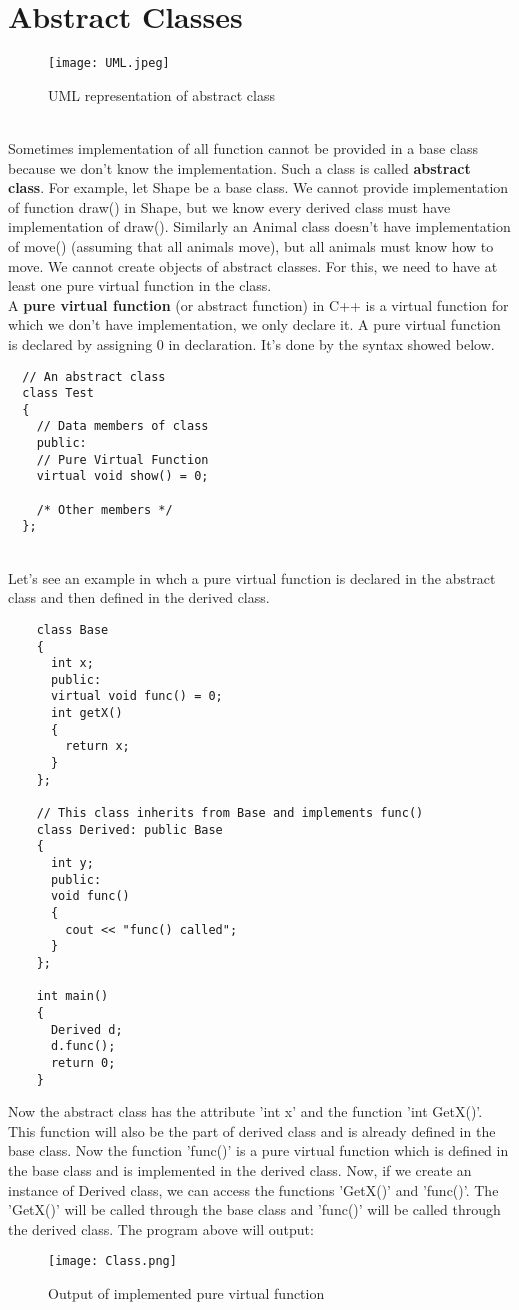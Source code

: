 \documentclass[11pt,fleqn]{book} %
\begin{document}
\section{Abstract Classes}
\begin{figure}[h]
  \centering
  \texttt{[image: UML.jpeg]}
  \caption{UML representation of abstract class}
\end{figure} ~\\
Sometimes implementation of all function cannot be provided in a base class because we don’t know the implementation. Such a class is called \textbf{abstract class}. For example, let Shape be a base class. We cannot provide implementation of function draw() in Shape, but we know every derived class must have implementation of draw(). Similarly an Animal class doesn’t have implementation of move() (assuming that all animals move), but all animals must know how to move. We cannot create objects of abstract classes. For this, we need to have at least one pure virtual function in the class. \\
A \textbf{pure virtual function} (or abstract function) in C++ is a virtual function for which we don’t have implementation, we only declare it. A pure virtual function is declared by assigning 0 in declaration. It's done by the syntax showed below.
\begin{lstlisting}
  // An abstract class
  class Test
  {   
    // Data members of class
    public:
    // Pure Virtual Function
    virtual void show() = 0;

    /* Other members */
  };
\end{lstlisting} ~\\
Let's see an example in whch a pure virtual function is declared in the abstract class and then defined in the derived class.
\begin{example}
  \begin{lstlisting}
    class Base
    {
      int x;
      public:
      virtual void func() = 0;
      int getX() 
      {
        return x; 
      }
    };

    // This class inherits from Base and implements func()
    class Derived: public Base
    {
      int y;
      public:
      void func()
      {
        cout << "func() called";
      }
    };

    int main()
    {
      Derived d;
      d.func();
      return 0;
    }
  \end{lstlisting}
  Now the abstract class has the attribute 'int x' and the function 'int GetX()'. This function will also be the part of derived class and is already defined in the base class. Now the function 'func()' is a pure virtual function which is defined in the base class and is implemented in the derived class. Now, if we create an instance of Derived class, we can access the functions 'GetX()' and 'func()'. The 'GetX()' will be called through the base class and 'func()' will be called through the derived class.
  The program above will output:
  \begin{figure}[h]
    \centering
    \texttt{[image: Class.png]}
    \caption{Output of implemented pure virtual function}
  \end{figure}
\end{example}
\end{document}
